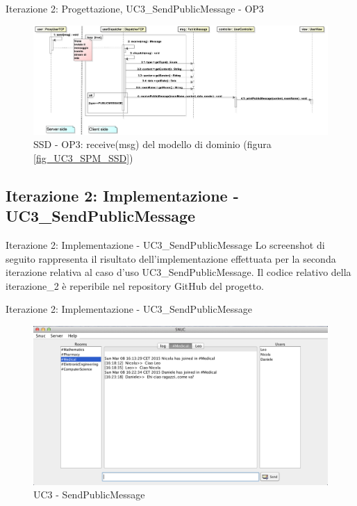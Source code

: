 \begin{frame} {Iterazione 2: Progettazione, UC3\_SendPublicMessage - OP3}
   \begin{figure}
     \includegraphics[scale=0.14]{image_astah/Iteration_2_DesignModel/UC3_SendPublicMessage_SSD_3_receiveMsg.png}{\centering}
     \caption{SSD - OP3: receive(msg) del modello di dominio (figura \ref{fig_UC3_SPM_SSD})}
     \label{fig_UC3_SSD_SRM_3} 
   \end{figure}
\end{frame}

\subsection{Iterazione 2: Implementazione - UC3\_SendPublicMessage}
 \begin{frame} {Iterazione 2: Implementazione - UC3\_SendPublicMessage }
   Lo screenshot di seguito rappresenta il risultato dell'implementazione effettuata per la seconda iterazione relativa al caso d'uso UC3\_SendPublicMessage.
   \newline
   Il codice relativo della iterazione\_2 è reperibile nel repository GitHub del progetto.
 \end{frame}


\begin{frame} {Iterazione 2: Implementazione - UC3\_SendPublicMessage}
   \begin{figure}
    \includegraphics[scale=0.32]{image_implementation/uc3/9.png}{\centering}
    \caption{UC3 - SendPublicMessage }
   \end{figure}
 \end{frame}

